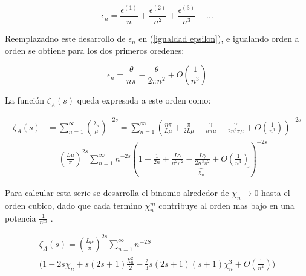 \begin{equation}
    \epsilon _n = 
    \frac{\epsilon ^{(1)}}{n}  + 
    \frac{\epsilon ^{(2)}}{n ^2}  + 
    \frac{\epsilon ^{(3)}}{n ^3}  + ...
\label{eq.epsilon}
\end{equation}


Reemplazadno este desarrollo de $\epsilon _n$ en (\ref{igualdad epsilon}), e igualando orden a orden se obtiene para los dos primeros oredenes:

\begin{equation}
    \epsilon _n = \frac{\theta}{n \pi} 
     - \frac{ \theta}{2 \pi n ^2 } + O \left( \frac{1}{n ^3}\right) 
\label{epsilons}
\end{equation}

\newpage


La función $ \zeta _A (s)$ queda expresada a este orden como:
    
\begin{equation}
\begin{aligned}
    \zeta _{A} (s) &=  
    \sum _{n=1} ^{\infty} 
    \left( \frac{\lambda _n }{\mu} 
    	\right) ^ {-2 s}  =
    \sum _{n=1} ^{\infty} 
    \left(
	\frac{n \pi}{L \mu} + 
    \frac{\pi}{2 L \mu} +
    \frac{\gamma}{n \pi \mu } -
    \frac{\gamma}{2 n ^2 \pi \mu } +
    O \left(  \frac{1}{n^3} \right) 
    \right) ^{-2 s}  \\[5pt]
    &= \left( \frac{L \mu }{\pi} \right) ^{2s}    
    \sum _{n=1} ^{\infty} 
    n ^{- 2 s} 
    \left(
    1 +     
    \underbrace{
        \frac{1}{2 n} + 
        \frac{L \gamma}{n^2 \pi ^2} -
        \frac{L \gamma}{2 n ^3 \pi ^2} +
        O(\frac{1}{n ^{4}} ) } _{ \chi _n}
    \right ) ^{-2 s}
\end{aligned}
\end{equation}

Para calcular esta serie se desarrolla el binomio alrededor de $\chi _n \rightarrow{0} $ hasta el orden cubico, dado que  cada termino $\chi _{n} ^{m} $ contribuye al orden mas bajo en una potencia $\frac{1}{n ^m}$ .

\begin{equation}
\begin{array}{c}
\zeta _{A} (s) = 
( \frac{L \mu }{\pi} ) ^{2s}
\sum _{n=1} ^{\infty}
  n  ^{-2 S} \\[5pt]
\Bigg(
	1 - 
	2 s \chi _n +  s(2s+1) \frac{\chi _n ^2}{2} - 
	\frac{2}{3} s(2s+1)(s+1) \chi _n ^3  + O( \frac{1}{n ^4}) \Bigg)

\end{array}
\end{equation}

